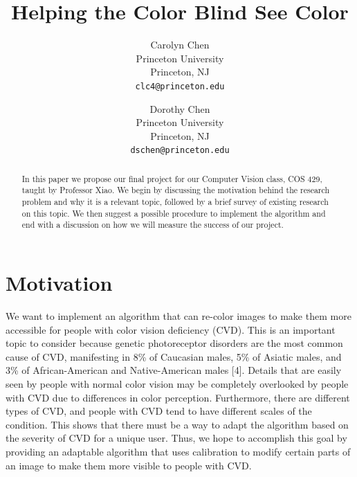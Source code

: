 \documentclass[10pt,twocolumn,letterpaper]{article}
\begin{document}
\title{Helping the Color Blind See Color}

\author{Carolyn Chen\\
Princeton University\\
Princeton, NJ\\
{\tt\small clc4@princeton.edu}
\and
Dorothy Chen\\
Princeton University\\
Princeton, NJ\\
{\tt\small dschen@princeton.edu}
}

\maketitle

\begin{abstract}
   In this paper we propose our final project for our Computer Vision class, COS 429, taught by Professor Xiao. We begin by discussing the motivation behind the research problem and why it is a relevant topic, followed by a brief survey of existing research on this topic. We then suggest a possible procedure to implement the algorithm and end with a discussion on how we will measure the success of our project. 
\end{abstract}

\section{Motivation}

We want to implement an algorithm that can re-color images to make them more accessible for people with color vision deficiency (CVD). This is an important topic to consider because genetic photoreceptor disorders are the most common cause of CVD, manifesting in 8\% of Caucasian males, 5\% of Asiatic males, and 3\% of African-American and Native-American males [4]. Details that are easily seen by people with normal color vision may be completely overlooked by people with CVD due to differences in color perception. Furthermore, there are different types of CVD, and people with CVD tend to have different scales of the condition. This shows that there must be a way to adapt the algorithm based on the severity of CVD for a unique user. Thus, we hope to accomplish this goal by providing an adaptable algorithm that uses calibration to modify certain parts of an image to make them more visible to people with CVD. 
\end{document}
